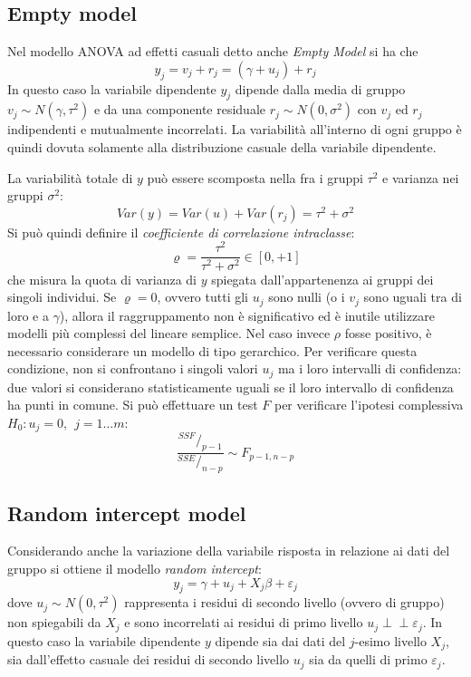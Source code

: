 \documentclass[a4page, 11pt]{article} %
\def\indep{\perp \!\!\! \perp }   %
\begin{document}
\subsection*{Empty model}
Nel modello ANOVA ad effetti casuali detto anche \textit{Empty Model} si ha che
\begin{equation*}
y_j = v_j + r_j = (\gamma + u_j) + r_j
\end{equation*}
In questo caso la variabile dipendente $y_j$ dipende dalla media di gruppo $v_j \sim N(\gamma, \tau^2)$ e da una componente residuale $r_j \sim N(0, \sigma^2)$ con $v_j$ ed $r_j$ indipendenti e mutualmente incorrelati.
La variabilità all’interno di ogni gruppo è quindi dovuta solamente alla distribuzione casuale della variabile dipendente.

La variabilità totale di $y$ può essere scomposta nella fra i gruppi $\tau^2$ e varianza nei gruppi $\sigma^2$:
\begin{equation*}
Var(y) = Var(u)+Var(r_j) = \tau^2 + \sigma^2
\end{equation*}
Si può quindi definire il \textit{coefficiente di correlazione intraclasse}:
\begin{equation*}
\varrho = \frac{\tau^2}{\tau^2 + \sigma^2} \in [0, +1]
\end{equation*}
che misura la quota di varianza di $y$ spiegata dall’appartenenza ai gruppi dei singoli individui.
Se $\varrho = 0$, ovvero tutti gli $u_j$ sono nulli (o i $v_j$ sono uguali tra di loro e a $\gamma$), allora il raggruppamento non è significativo ed è inutile utilizzare modelli più complessi del lineare semplice.
Nel caso invece $\rho$ fosse positivo, è necessario considerare un modello di tipo gerarchico.
Per verificare questa condizione, non si confrontano i singoli valori $u_j$ ma i loro intervalli di confidenza: due valori si considerano statisticamente uguali se il loro intervallo di confidenza ha punti in comune.
Si può effettuare un test $F$ per verificare l'ipotesi complessiva $H_0 : u_j = 0, \hspace{5pt} j = 1 \dots m$:
\begin{equation*}
  \frac{^{SSF}/_{p - 1}}{^{SSE}/_{n - p}} \sim F_{p - 1, n - p}
\end{equation*}

\subsection*{Random intercept model}
Considerando anche la variazione della variabile risposta in relazione ai dati del gruppo si ottiene il modello \textit{random intercept}:
\begin{equation*}
y_j = \gamma + u_j + X_j \beta + \varepsilon_j
\end{equation*}
dove $u_j \sim N(0, \tau^2)$ rappresenta i residui di secondo livello (ovvero di gruppo) non spiegabili da $X_j$ e sono incorrelati ai residui di primo livello $u_j \indep \varepsilon_j$.
In questo caso la variabile dipendente $y$ dipende sia dai dati del $j$-esimo livello $X_j$, sia dall'effetto casuale dei residui di secondo livello $u_j$ sia da quelli di primo $\varepsilon_j$.
\end{document}
